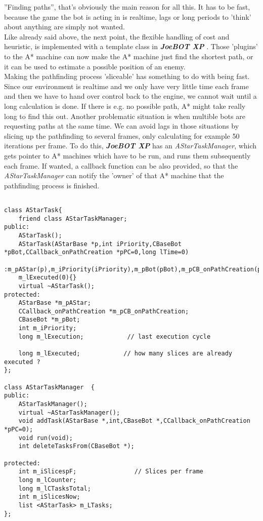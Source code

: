 \documentclass[12pt]{article}
\newcommand {\joebotxp}{\textit{\textbf{JoeBOT XP}} }
\begin{document}
''Finding paths'', that's obviously the main reason for all this. It has to be fast, because the game the bot is acting in is realtime, lags or long periods to 'think' about anything are simply not wanted.\\
Like already said above, the next point, the flexible handling of cost and heuristic, is implemented with a template class in \joebotxp. Those 'plugins' to the A* machine can now make the A* machine just find the shortest path, or it can be used to estimate a possible position of an enemy.\\
Making the pathfinding process 'sliceable' has something to do with being fast. Since our environment is realtime and we only have very little time each frame and then we have to hand over control back to the engine, we cannot wait until a long calculation is done. If there is e.g. no possible path, A* might take really long to find this out. Another problematic situation is when multible bots are requesting paths at the same time. We can avoid lags in those situations by slicing up the pathfinding to several frames, only calculating for example 50 iterations per frame. To do this, \joebotxp has an \textit{AStarTaskManager}, which gets pointer to A* machines which have to be run, and runs them subsequently each frame. If wanted, a callback function can be also provided, so that the \textit{AStarTaskManager} can notify the 'owner' of that A* machine that the pathfinding process is finished.

\scriptsize
\linespread{1.0}
\begin{verbatim}

class AStarTask{
    friend class AStarTaskManager;
public:
    AStarTask();
    AStarTask(AStarBase *p,int iPriority,CBaseBot *pBot,CCallback_onPathCreation *pPC=0,long lTime=0)
    :m_pAStar(p),m_iPriority(iPriority),m_pBot(pBot),m_pCB_onPathCreation(pPC),m_lExecution(lTime),
    m_lExecuted(0){}
    virtual ~AStarTask();
protected:
    AStarBase *m_pAStar;
    CCallback_onPathCreation *m_pCB_onPathCreation;
    CBaseBot *m_pBot;
    int m_iPriority;
    long m_lExecution;            // last execution cycle

    long m_lExecuted;            // how many slices are already executed ?
};

class AStarTaskManager  {
public:
    AStarTaskManager();
    virtual ~AStarTaskManager();
    void addTask(AStarBase *,int,CBaseBot *,CCallback_onPathCreation *pPC=0);
    void run(void);
    int deleteTasksFrom(CBaseBot *);
    
protected:
    int m_iSlicespF;                // Slices per frame
    long m_lCounter;
    long m_lCTasksTotal;
    int m_iSlicesNow;
    list <AStarTask> m_LTasks;
};

\end{verbatim}
\linespread{1.3}
\normalsize
\end{document}
